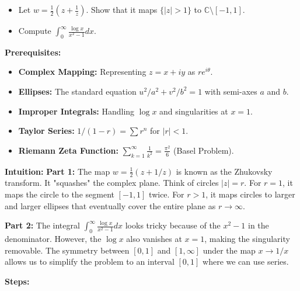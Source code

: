 \begin{exercise}
\label{analysis:2016:4}
\begin{itemize}
    \item[1)] Let $w=\frac{1}{2}(z+\frac{1}{z})$. Show that it maps $\{|z|>1\}$ to $\mathbb{C}\setminus[-1,1]$.
    \item[2)] Compute $\int_0^\infty \frac{\log x}{x^2-1} dx$.
\end{itemize}
\end{exercise}

\begin{solution}
\textbf{Prerequisites:}
\begin{itemize}
    \item \textbf{Complex Mapping:} Representing $z = x + iy$ as $re^{i\theta}$.
    \item \textbf{Ellipses:} The standard equation $u^2/a^2 + v^2/b^2 = 1$ with semi-axes $a$ and $b$.
    \item \textbf{Improper Integrals:} Handling $\log x$ and singularities at $x=1$.
    \item \textbf{Taylor Series:} $1/(1-r) = \sum r^n$ for $|r| < 1$.
    \item \textbf{Riemann Zeta Function:} $\sum_{k=1}^\infty \frac{1}{k^2} = \frac{\pi^2}{6}$ (Basel Problem).
\end{itemize}

\textbf{Intuition:}
\textbf{Part 1:} The map $w = \frac{1}{2}(z + 1/z)$ is known as the Zhukovsky transform. It "squashes" the complex plane. Think of circles $|z|=r$. For $r=1$, it maps the circle to the segment $[-1, 1]$ twice. For $r > 1$, it maps circles to larger and larger ellipses that eventually cover the entire plane as $r \to \infty$.

\textbf{Part 2:} The integral $\int_0^\infty \frac{\log x}{x^2-1} dx$ looks tricky because of the $x^2-1$ in the denominator. However, the $\log x$ also vanishes at $x=1$, making the singularity removable. The symmetry between $[0, 1]$ and $[1, \infty]$ under the map $x \to 1/x$ allows us to simplify the problem to an interval $[0, 1]$ where we can use series.

\textbf{Steps:}


\end{solution}
